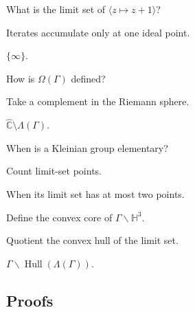\begin{exercise}\label{exr:vii37-ped-02}
What is the limit set of \(\langle z\mapsto z+1\rangle\)?
\end{exercise}

\begin{hint}
Iterates accumulate only at one ideal point.
\end{hint}

\begin{solution}
\(\{\infty\}\).
\end{solution}

\begin{exercise}[Domain]\label{exr:vii37-ped-03}
How is \(\Omega(\Gamma)\) defined?
\end{exercise}

\begin{hint}
Take a complement in the Riemann sphere.
\end{hint}

\begin{solution}
\(\widehat{\mathbb C}\setminus\Lambda(\Gamma)\).
\end{solution}

\begin{exercise}[Elementary]\label{exr:vii37-ped-04}
When is a Kleinian group elementary?
\end{exercise}

\begin{hint}
Count limit-set points.
\end{hint}

\begin{solution}
When its limit set has at most two points.
\end{solution}

\begin{exercise}\label{exr:vii37-ped-05}
Define the convex core of \(\Gamma\backslash\mathbb H^3\).
\end{exercise}

\begin{hint}
Quotient the convex hull of the limit set.
\end{hint}

\begin{solution}
\(\Gamma\backslash\operatorname{Hull}(\Lambda(\Gamma))\).
\end{solution}

\subsection*{Proofs}

